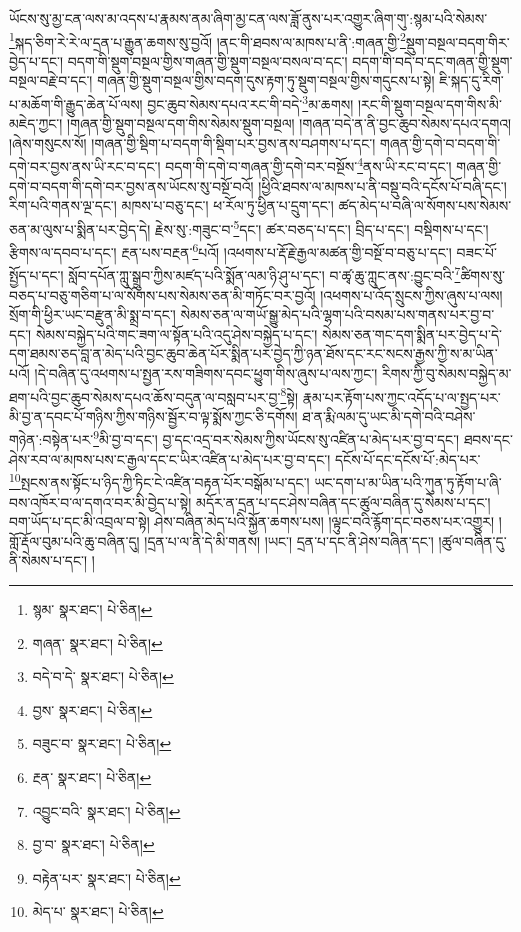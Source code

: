 ཡོངས་སུ་མྱ་ངན་ལས་མ་འདས་པ་རྣམས་ནམ་ཞིག་མྱ་ངན་ལས་ཟློ་ནུས་པར་འགྱུར་ཞིག་གུ་:སྙམ་པའི་སེམས་\footnote{སྙམ་  སྣར་ཐང་།  པེ་ཅིན། }སྐད་ཅིག་རེ་རེ་ལ་དྲན་པ་རྒྱུན་ཆགས་སུ་བྱའོ། །ནང་གི་ཐབས་ལ་མཁས་པ་ནི་:གཞན་གྱི་\footnote{གཞན་  སྣར་ཐང་།  པེ་ཅིན། }སྡུག་བསྔལ་བདག་གིར་བྱེད་པ་དང་། བདག་གི་སྡུག་བསྔལ་གྱིས་གཞན་གྱི་སྡུག་བསྔལ་བསལ་བ་དང་། བདག་གི་བདེ་བ་དང་གཞན་གྱི་སྡུག་བསྔལ་བརྗེ་བ་དང་། གཞན་གྱི་སྡུག་བསྔལ་གྱིས་བདག་དུས་རྟག་ཏུ་སྡུག་བསྔལ་གྱིས་གདུངས་པ་སྟེ། ཇི་སྐད་དུ་རིག་པ་མཆོག་གི་རྒྱུད་ཆེན་པོ་ལས། བྱང་ཆུབ་སེམས་དཔའ་རང་གི་བདེ་\footnote{བདེ་བ་དེ་  སྣར་ཐང་།  པེ་ཅིན། }མ་ཆགས། །རང་གི་སྡུག་བསྔལ་དག་གིས་མི་མཇེད་ཀྱང་། །གཞན་གྱི་སྡུག་བསྔལ་དག་གིས་སེམས་སྡུག་བསྔལ། །གཞན་བདེ་ན་ནི་བྱང་ཆུབ་སེམས་དཔའ་དགའ། །ཞེས་གསུངས་སོ། །གཞན་གྱི་སྡིག་པ་བདག་གི་སྡིག་པར་བྱས་ནས་བཤགས་པ་དང་། གཞན་གྱི་དགེ་བ་བདག་གི་དགེ་བར་བྱས་ནས་ཡི་རང་བ་དང་། བདག་གི་དགེ་བ་གཞན་གྱི་དགེ་བར་བསྔོས་\footnote{བྱས་  སྣར་ཐང་།  པེ་ཅིན། }ནས་ཡི་རང་བ་དང་། གཞན་གྱི་དགེ་བ་བདག་གི་དགེ་བར་བྱས་ནས་ཡོངས་སུ་བསྔོ་བའོ། །ཕྱིའི་ཐབས་ལ་མཁས་པ་ནི་བསྡུ་བའི་དངོས་པོ་བཞི་དང་། རིག་པའི་གནས་ལྔ་དང་། མཁས་པ་བཅུ་དང་། ཕ་རོལ་ཏུ་ཕྱིན་པ་དྲུག་དང་། ཚད་མེད་པ་བཞི་ལ་སོགས་པས་སེམས་ཅན་མ་ལུས་པ་སྨིན་པར་བྱེད་དེ། རྗེས་སུ་:གཟུང་བ་\footnote{བཟུང་བ་  སྣར་ཐང་།  པེ་ཅིན། }དང་། ཚར་བཅད་པ་དང་། བྲིད་པ་དང་། བསྡིགས་པ་དང་། རྩིགས་ལ་དབབ་པ་དང་། རྔན་པས་བརྔན་\footnote{རྔན་  སྣར་ཐང་།  པེ་ཅིན། }པའོ། །འཕགས་པ་རྡོ་རྗེ་རྒྱལ་མཚན་གྱི་བསྔོ་བ་བཅུ་པ་དང་། བཟང་པོ་སྤྱོད་པ་དང་། སློབ་དཔོན་ཀླུ་སྒྲུབ་ཀྱིས་མཛད་པའི་སྨོན་ལམ་ཉི་ཤུ་པ་དང་། བ་ཚྭ་ཆུ་ཀླུང་ནས་:བྱུང་བའི་\footnote{འབྱུང་བའི་  སྣར་ཐང་།  པེ་ཅིན། }ཚིགས་སུ་བཅད་པ་བཅུ་གཅིག་པ་ལ་སོགས་པས་སེམས་ཅན་མི་གཏོང་བར་བྱའོ། །འཕགས་པ་འོད་སྲུངས་ཀྱིས་ཞུས་པ་ལས། སྲོག་གི་ཕྱིར་ཡང་བརྫུན་མི་སྨྲ་བ་དང་། སེམས་ཅན་ལ་གཡོ་སྒྱུ་མེད་པའི་ལྷག་པའི་བསམ་པས་གནས་པར་བྱ་བ་དང་། སེམས་བསྐྱེད་པའི་གང་ཟག་ལ་སྟོན་པའི་འདུ་ཤེས་བསྐྱེད་པ་དང་། སེམས་ཅན་གང་དག་སྨིན་པར་བྱེད་པ་དེ་དག་ཐམས་ཅད་བླ་ན་མེད་པའི་བྱང་ཆུབ་ཆེན་པོར་སྨིན་པར་བྱེད་ཀྱི་ཉན་ཐོས་དང་རང་སངས་རྒྱས་ཀྱི་ས་མ་ཡིན་པའོ། །དེ་བཞིན་དུ་འཕགས་པ་སྤྱན་རས་གཟིགས་དབང་ཕྱུག་གིས་ཞུས་པ་ལས་ཀྱང་། རིགས་ཀྱི་བུ་སེམས་བསྐྱེད་མ་ཐག་པའི་བྱང་ཆུབ་སེམས་དཔའ་ཆོས་བདུན་ལ་བསླབ་པར་བྱ་\footnote{བྱ་བ་  སྣར་ཐང་།  པེ་ཅིན། }སྟེ། རྣམ་པར་རྟོག་པས་ཀྱང་འདོད་པ་ལ་སྤྱད་པར་མི་བྱ་ན་དབང་པོ་གཉིས་ཀྱིས་གཉིས་སྦྱོར་བ་ལྟ་སྨོས་ཀྱང་ཅི་དགོས། ཐ་ན་རྨི་ལམ་དུ་ཡང་མི་དགེ་བའི་བཤེས་གཉེན་:བསྟེན་པར་\footnote{བརྟེན་པར་  སྣར་ཐང་།  པེ་ཅིན། }མི་བྱ་བ་དང་། བྱ་དང་འདྲ་བར་སེམས་ཀྱིས་ཡོངས་སུ་འཛིན་པ་མེད་པར་བྱ་བ་དང་། ཐབས་དང་ཤེས་རབ་ལ་མཁས་པས་ང་རྒྱལ་དང་ང་ཡིར་འཛིན་པ་མེད་པར་བྱ་བ་དང་། དངོས་པོ་དང་དངོས་པོ་:མེད་པར་\footnote{མེད་པ་  སྣར་ཐང་།  པེ་ཅིན། }སྤངས་ནས་སྟོང་པ་ཉིད་ཀྱི་ཏིང་ངེ་འཛིན་བརྟན་པོར་བསྒོམ་པ་དང་། ཡང་དག་པ་མ་ཡིན་པའི་ཀུན་ཏུ་རྟོག་པ་ཞི་བས་འཁོར་བ་ལ་དགའ་བར་མི་བྱེད་པ་སྟེ། མདོར་ན་དྲན་པ་དང་ཤེས་བཞིན་དང་ཚུལ་བཞིན་དུ་སེམས་པ་དང་། བག་ཡོད་པ་དང་མི་འབྲལ་བ་སྟེ། ཤེས་བཞིན་མེད་པའི་སྐྱོན་ཆགས་པས། །ལྟུང་བའི་རྙོག་དང་བཅས་པར་འགྱུར། །གློ་རྡོལ་བུམ་པའི་ཆུ་བཞིན་དུ། །དྲན་པ་ལ་ནི་དེ་མི་གནས། །ཡང་། དྲན་པ་དང་ནི་ཤེས་བཞིན་དང་། །ཚུལ་བཞིན་དུ་ནི་སེམས་པ་དང་། །
